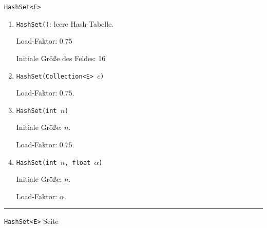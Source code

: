 \documentclass{slides}
\newcounter{mypage}
\begin{document}
\begin{slide}{}
\normalsize

\begin{center}
\texttt{HashSet<E>}
\end{center}
\vspace*{0.5cm}

\footnotesize
\begin{enumerate}
\item \texttt{HashSet()}: \quad leere Hash-Tabelle.  

      Load-Faktor: $0.75$ 

      Initiale Gr\"o{\ss}e des Feldes: 16
\item \texttt{HashSet(Collection<E> $c$)}

      Load-Faktor: $0.75$.
\item \texttt{HashSet(int $n$)}
  
      Initiale Gr\"o{\ss}e: $n$.  

      Load-Faktor: $0.75$.
\item \texttt{HashSet(int $n$, float $\alpha$)}

      Initiale Gr\"o{\ss}e: $n$.  

      Load-Faktor: $\alpha$.
\end{enumerate}



\vspace*{\fill}
\tiny \addtocounter{mypage}{1}
\rule{17cm}{1mm}
\texttt{HashSet<E>} \hspace*{\fill} Seite 
\end{slide}


\end{document}
